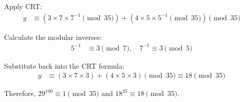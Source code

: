 \documentclass[11pt]{article}
\begin{document}
{\begin{minipage}{0.98\linewidth}
\begin{enumerate}
            \vspace{-1.5em}
            Apply CRT: \vspace{-1em}
            \begin{align*}
                y &\equiv (3 \times 7 \times 7^{-1} \pmod{35}) + (4 \times 5 \times 5^{-1} \pmod{35}) \pmod{35}
            \end{align*}

            \vspace{-1em}
            Calculate the modular inverses: \vspace{-0.75em}
            \begin{align*}
                5^{-1} &\equiv 3 \pmod{7}, \quad 7^{-1} \equiv 3 \pmod{5}
            \end{align*}

            \vspace{-1.2em}
            Substitute back into the CRT formula: \vspace{-0.75em}
            \begin{align*}
                y &\equiv (3 \times 7 \times 3) + (4 \times 5 \times 3) \pmod{35} \equiv 18 \pmod{35}
            \end{align*}
        \end{enumerate}

        \vspace{-1em}
        Therefore, $29^{100} \equiv 1 \pmod{35}$ and $18^{25} \equiv 18 \pmod{35}$.
        
    \end{minipage}
}
\end{document}
